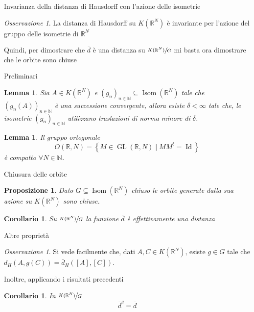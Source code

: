 \documentclass{beamer}
\newcounter{counter1}
\theoremstyle{plain}
\newtheorem{mylem}[counter1]{Lemma}
\newtheorem{mypro}[counter1]{Proposizione}
\newtheorem{mycor}[counter1]{Corollario}
\theoremstyle{definition}
\theoremstyle{remark}
\newtheorem{myoss}[counter1]{Osservazione}
\newcommand{\obar}[1]{\overline{#1}}
\newcommand{\set}[1]{\left\{#1\right\}}
\newcommand{\pa}[1]{\left(#1\right)}
\newcommand{\bra}[1]{\left[#1\right]}
\DeclareMathOperator{\id}{Id}
\DeclareMathOperator{\gl}{GL}
\DeclareMathOperator{\isom}{Isom}
\begin{document}
\begin{frame}{Invarianza della distanza di Hausdorff con l'azione
    delle isometrie}
  \begin{myoss}
    La distanza di Hausdorff su $K(\mathbb{R}^N)$ è invariante per
    l'azione del gruppo delle isometrie di $\mathbb{R}^N$
  \end{myoss}

  Quindi, per dimostrare che $\obar d$ è una distanza su
  $\sfrac{K(\mathbb{R}^N)}{G}$ mi basta ora dimostrare che le orbite
  sono chiuse
\end{frame}

\begin{frame}{Preliminari}
  \begin{mylem}
    Sia $A \in K(\mathbb{R}^N)$ e $\pa{ g_n} _{n \in \mathbb{N}}
    \subseteq \isom( \mathbb{R}^N)$ tale che $\pa{ g_n(A) } _{n \in
      \mathbb{N}}$ è una successione convergente, allora esiste $\delta
    < \infty$ tale che, le isometrie $\pa{ g_n} _{n\in \mathbb{N}}$
    utilizzano traslazioni di norma minore di $\delta$.
  \end{mylem}
  \begin{mylem}
    Il gruppo ortogonale 
    \[ O(\mathbb{R},N) = \set{ M \in \gl (\mathbb{R},N) \mid M M^t =
      \id } \]
    è compatto $\forall N \in \mathbb{N}$.
  \end{mylem}
\end{frame}

\begin{frame}{Chiusura delle orbite}
  \begin{mypro}
    Dato $G \subseteq \isom(\mathbb{R}^N)$ chiuso le orbite generate
    dalla sua azione su $K(\mathbb{R}^N)$ sono chiuse.
  \end{mypro}
  \begin{mycor}
    Su $\sfrac{K(\mathbb{R}^N)}{G}$ la funzione $\obar d$ è
    effettivamente una distanza
  \end{mycor}
\end{frame}

\begin{frame}{Altre proprietà}
  \begin{myoss}
    Si vede facilmente che, dati $A,C \in K(\mathbb{R}^N)$, esiste $g
    \in G$ tale che $d_H \pa{A, g(C)} = \bar d _H \pa{ \bra{A},
      \bra{C}}$.
  \end{myoss}
  Inoltre, applicando i risultati precedenti
  \begin{mycor}
    In $\sfrac{K(\mathbb{R}^N)}{G}$ 
    \[ \obar{d} ^g = \obar{d} \]
  \end{mycor}
\end{frame}
\end{document}
